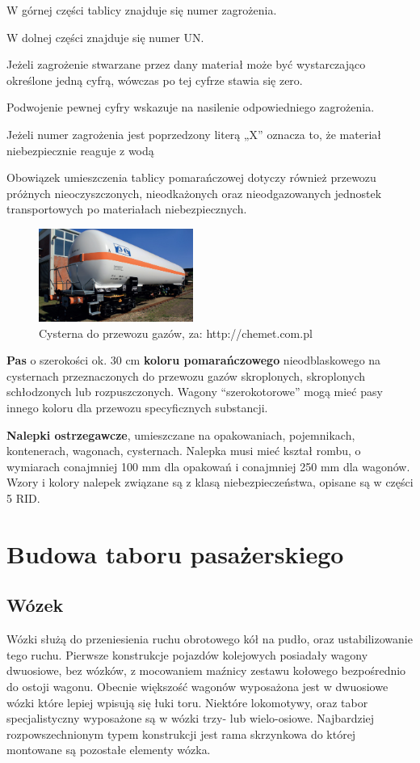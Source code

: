 W górnej części tablicy znajduje się numer zagrożenia.

W dolnej części znajduje się numer UN.

Jeżeli zagrożenie stwarzane przez dany materiał może być wystarczająco określone jedną cyfrą, wówczas po tej cyfrze stawia się zero.

Podwojenie pewnej cyfry wskazuje na nasilenie odpowiedniego zagrożenia.

Jeżeli numer zagrożenia jest poprzedzony literą „X” oznacza to, że materiał niebezpiecznie reaguje z wodą

Obowiązek umieszczenia tablicy pomarańczowej dotyczy również przewozu próżnych nieoczyszczonych, nieodkażonych oraz nieodgazowanych jednostek transportowych po materiałach niebezpiecznych.
\begin{figure}
	\includegraphics[width=0.45\textwidth]{skryptkierownik-img/cysterna-rid.jpg}
	\caption{Cysterna do przewozu gazów, za: http://chemet.com.pl}
	\label{fig:cysterna}
\end{figure}
\textbf{Pas} o szerokości ok. 30 cm\textbf{ koloru pomarańczowego} nieodblaskowego na cysternach przeznaczonych do przewozu gazów skroplonych, skroplonych schłodzonych lub rozpuszczonych. Wagony “szerokotorowe” mogą mieć pasy innego koloru dla przewozu specyficznych substancji.

\textbf{Nalepki ostrzegawcze}, umieszczane na opakowaniach, pojemnikach, kontenerach, wagonach, cysternach. Nalepka musi mieć kształ rombu, o wymiarach conajmniej 100 mm dla opakowań i conajmniej 250 mm dla wagonów. Wzory i kolory nalepek
związane są z klasą niebezpieczeństwa, opisane są w części 5 RID.


\chapter{Budowa taboru pasażerskiego}
	\section{Wózek}

Wózki służą do przeniesienia ruchu obrotowego kół na pudło, oraz ustabilizowanie tego ruchu. Pierwsze konstrukcje pojazdów kolejowych posiadały wagony dwuosiowe, bez wózków, z mocowaniem maźnicy zestawu kołowego bezpośrednio do ostoji wagonu. Obecnie większość wagonów wyposażona jest w dwuosiowe wózki które lepiej wpisują się łuki toru. Niektóre lokomotywy, oraz tabor specjalistyczny wyposażone są w wózki trzy- lub wielo-osiowe. Najbardziej rozpowszechnionym typem konstrukcji jest rama skrzynkowa do której montowane są pozostałe elementy wózka.

